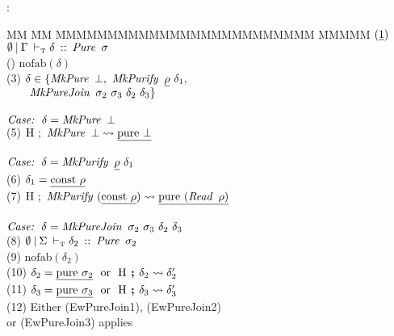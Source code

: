 \bigskip
\rbProof:
\begin{tabbing}
MM \= MM \= MMMMMMMMMMMMMMMMMMMMMMMMM \= MMMMM  \kill
\>	$(\underline{1})$
		\> $\kiJudge{\emptyset}{\Gamma}{\delta}{\iPure \ \sigma}$
		\> 
\\[1ex]	
\>	() 
		\> $\text{nofab}(\delta)$
		\> 
\\[1ex]	
\>	(3) 	\> $\delta \in 
			\{ \operatorname{\mathit{MkPure}} \ \bot
			 , \ \operatorname{\mathit{MkPurify}} \ \underline{\rho} \ \delta_1,$ 
\\[1ex]	
\>		\> $\qq  \iMkPureJoin \ \sigma_2 \ \sigma_3 \ \delta_2 \ \delta_3 \}$
		\> 
\\
\\
\>	$\emph{Case:}  \ \ \delta = \iMkPure \ \bot$
\\[1ex]	
\>	(5) 	\> \quad $\textrm{H} \ ; \ \operatorname{\mathit{MkPure}} \ \bot \leadsto \underline{\textrm{pure} \ \bot}$
		\> 
\\
\\
\>	$\emph{Case:}  \ \ \delta = \iMkPurify \ \un{\rho} \ \delta_1$
\\[1ex]	
\>	(6) 	\> \quad $\delta_1 = \un{\rconst \ \rho}$
		\> 
\\[1ex]	
\>	(7) 	\> \quad $\heap \ ; \ \iMkPurify \ (\un{\rconst \ \rho}) \leadsto \un{\rpure \ (\iRead \ \rho)}$
		\> 
\\
\\
\>	$\emph{Case:}  \ \ \delta = \iMkPureJoin \ \sigma_2 \ \sigma_3 \ \delta_2 \ \delta_3$
\\[1ex]	
\>	(8) 	\> \quad $\kiJudge{\emptyset}{\Sigma}{\delta_2}{\iPure \ \sigma_2}$
		\> 
\\[1ex]	
\>	(9) 	\> \quad $\text{nofab}(\delta_2)$
		\> 
\\[1ex]	
\>	(10)	\> \quad $\delta_2 = \un{\rpure \ \sigma_2} \ \ \text{or} \ \
		   \heap \with \delta_2 \leadsto \delta_2'$
		\> 
\\[1ex]	
\>	(11)	\> \quad $\delta_3 = \un{\rpure \ \sigma_3} \ \ \text{or} \ \
		   \heap \with \delta_3 \leadsto \delta_3'$
		\> \pby{Similarly}
\\[1ex]	
\>	(12)	\> \quad Either (EwPureJoin1), (EwPureJoin2)
\\[1ex]	
\> 		\> \quad \qq  or (EwPureJoin3) applies
\end{tabbing}
